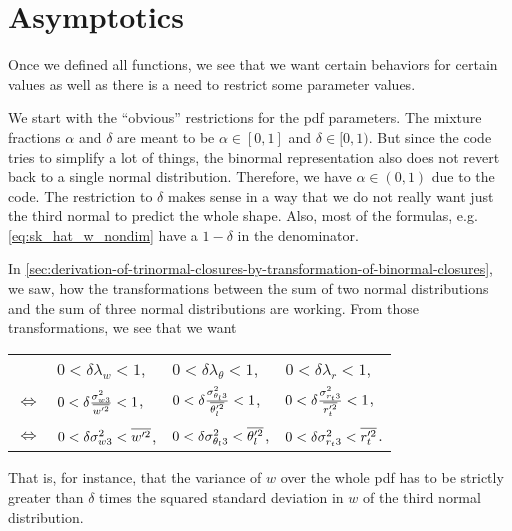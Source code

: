 \chapter{Asymptotics}\label{ch:asymptotics}

Once we defined all functions,
we see that we want certain behaviors for certain values as well as
there is a need to restrict some parameter values.

We start with the \enquote{obvious} restrictions for the \gls{pdf} parameters.
The mixture fractions $\alpha$ and $\delta$ are meant to be $\alpha \in [0,1]$ and $\delta \in [0,1)$.
But since the code tries to simplify a lot of things,
the binormal representation also does not revert back to a single normal distribution.
Therefore, we have $\alpha \in (0,1)$ due to the code.
The restriction to $\delta$ makes sense in a way
that we do not really want just the third normal to predict the whole shape.
Also, most of the formulas, e.g. \cref{eq:sk_hat_w_nondim} have a $1-\delta$ in the denominator.

In \cref{sec:derivation-of-trinormal-closures-by-transformation-of-binormal-closures},
we saw,
how the transformations between the sum of two normal distributions
and the sum of three normal distributions are working.
From those transformations, we see that we want
\begin{table}[!htb]
    \centering
    \begin{tabular}{llll}
        &
        $0 < \delta\lambda_w < 1$, &
        $0 < \delta\lambda_\theta < 1$, &
        $0 < \delta\lambda_r < 1$, \\
        $\iff$ &
        $0 < \delta\frac{\sigma_{w3}^2}{\overline{w'^2}} < 1$, &
        $0 < \delta\frac{\sigma_{\theta_l 3}^2}{\overline{\theta_l'^2}} < 1$, &
        $0 < \delta\frac{\sigma_{r_t 3}^2}{\overline{r_t'^2}} < 1$, \\
        $\iff$ &
        $0 < \delta\sigma_{w3}^2 < \overline{w'^2}$, &
        $0 < \delta\sigma_{\theta_l 3}^2 < \overline{\theta_l'^2}$, &
        $0 < \delta\sigma_{r_t 3}^2 < \overline{r_t'^2}$.
    \end{tabular}
    \label{tab:table_asymp_2}
\end{table}

That is, for instance,
that the variance of $w$ over the whole \gls{pdf} has to be strictly greater than $\delta$ times
the squared standard deviation in $w$ of the third normal distribution.

